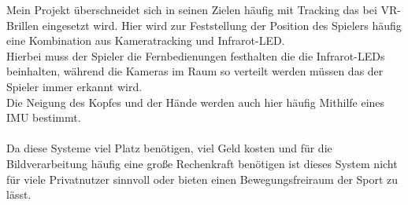 Mein Projekt überschneidet sich in seinen Zielen häufig 
mit Tracking das bei VR-Brillen eingesetzt wird. Hier wird
zur Feststellung der Position des Spielers häufig eine 
Kombination aus Kameratracking und Infrarot-LED. \\
Hierbei muss der Spieler die Fernbedienungen festhalten die
die Infrarot-LEDs beinhalten, während die Kameras im Raum 
so verteilt werden müssen das der Spieler immer erkannt wird.\\
Die Neigung des Kopfes und der Hände werden auch hier häufig 
Mithilfe eines IMU bestimmt.\\
\\
Da diese Systeme viel Platz benötigen, viel Geld kosten und 
für die Bildverarbeitung häufig eine große Rechenkraft benötigen
ist dieses System nicht für viele Privatnutzer sinnvoll oder 
bieten einen Bewegungsfreiraum der Sport zu lässt.\\


